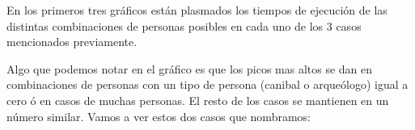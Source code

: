  


\par En los primeros tres gráficos  están plasmados los tiempos de ejecución de las distintas combinaciones de personas posibles en cada uno de los 3 casos mencionados previamente. 

\par Algo que podemos notar en el gráfico es que los picos mas altos se dan en combinaciones de personas con un tipo de persona (canibal o arqueólogo) igual a cero ó en casos de muchas personas. El resto de los casos se mantienen en un número similar. Vamos a ver estos dos casos que nombramos:

